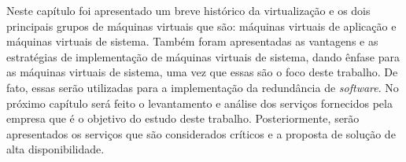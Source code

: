 Neste capítulo foi apresentado um breve histórico da virtualização e os dois principais grupos de máquinas virtuais que são: máquinas virtuais 
de aplicação e máquinas virtuais de sistema. Também foram apresentadas as vantagens e as estratégias de implementação de máquinas virtuais 
de sistema, dando ênfase para as máquinas virtuais de sistema, uma vez que essas são o foco deste trabalho. De fato, essas serão utilizadas para 
a implementação da redundância de \textit{software}. No próximo capítulo será feito o levantamento e análise dos serviços fornecidos pela empresa
que é o objetivo do estudo deste trabalho. Posteriormente, serão apresentados os serviços que são considerados críticos e a proposta de solução 
de alta disponibilidade.

